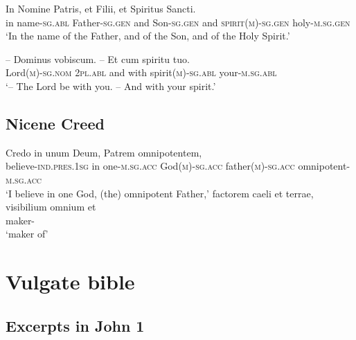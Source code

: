 \documentclass[a4paper, oneside, 12pt]{report}
\newcommand*{\category}[1]{\textsc{#1}}
\newcommand{\translate}[1]{`#1'}
\begin{document}
\begin{exe}
    \ex\label{ex:text.mass.1} \gll In Nomine Patris, et Filii, et Spiritus Sancti. \\
    in name-\category{sg}.\category{abl} Father-\category{sg}.\category{gen} 
    and Son-\category{sg}.\category{gen} 
    and \category{spirit}(\category{m})-\category{sg}.\category{gen}
    holy-\category{m}.\category{sg}.\category{gen} \\
    \glt \translate{In the name of the Father, and of the Son, and of the Holy Spirit.}

    \ex\label{ex:text.mass.2} \gll -- Dominus vobiscum. -- Et cum spiritu tuo. \\
    {} Lord(\category{m})-\category{sg}.\category{nom} 
    \category{2pl}.\category{abl} 
    {} and with spirit(\category{m})-\category{sg}.\category{abl} 
    your-\category{m}.\category{sg}.\category{abl} \\
    \glt \translate{-- The Lord be with you. -- And with your spirit.}
    
    \ex 
\end{exe}

\subsection{Nicene Creed}

\begin{exe}
    \ex \gll Credo in unum Deum, Patrem omnipotentem, \\
    believe-\category{ind}.\category{pres}.\category{1sg} in 
    one-\category{m}.\category{sg}.\category{acc} 
    God(\category{m})-\category{sg}.\category{acc} 
    father(\category{m})-\category{sg}.\category{acc}
    omnipotent-\category{m}.\category{sg}.\category{acc} \\
    \glt \translate{I believe in one God, (the) omnipotent Father,} 
    \ex \gll factorem caeli et terrae, visibilium omnium et \\ 
    maker- \\
    \glt \translate{maker of}
\end{exe}

\section{Vulgate bible}

\subsection{Excerpts in John 1}\label{sec:text.vulgate.john}
\end{document}
